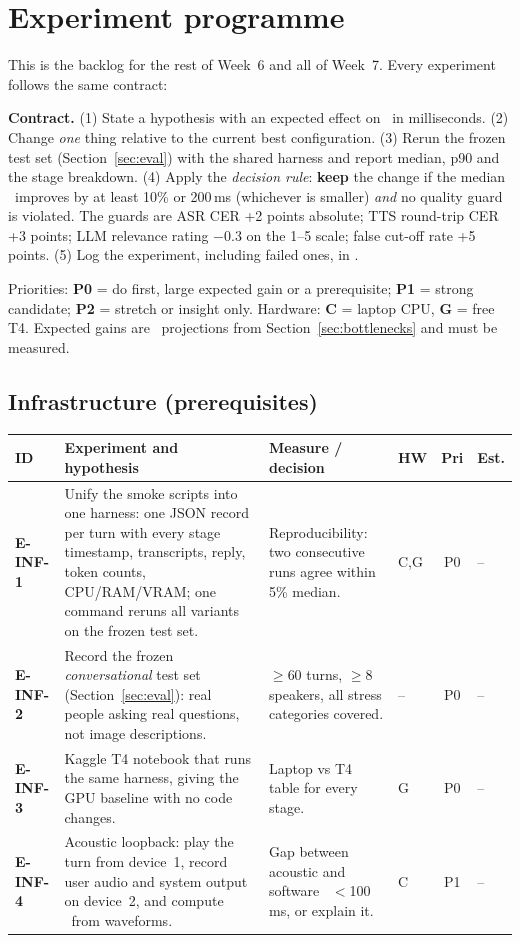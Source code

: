 \section{Experiment programme}
\label{sec:experiments}

This is the backlog for the rest of Week~6 and all of Week~7. Every experiment follows the same
contract:
\begin{keybox}
\textbf{Contract.} (1) State a hypothesis with an expected effect on \ttfa\ in milliseconds. (2) Change
\emph{one} thing relative to the current best configuration. (3) Rerun the frozen test set
(Section~\ref{sec:eval}) with the shared harness and report median, p90 and the stage breakdown.
(4) Apply the \emph{decision rule}: \textbf{keep} the change if the median \ttfa\ improves by at least
10\% or 200\,ms (whichever is smaller) \emph{and} no quality guard is violated. The guards are ASR CER
+2 points absolute; TTS round-trip CER +3 points; LLM relevance rating $-0.3$ on the 1--5 scale;
false cut-off rate +5 points. (5) Log the experiment, including failed ones, in
.
\end{keybox}

Priorities: \textbf{P0} = do first, large expected gain or a prerequisite; \textbf{P1} = strong
candidate; \textbf{P2} = stretch or insight only. Hardware: \textbf{C} = laptop CPU, \textbf{G} = free T4.
Expected gains are \proj\ projections from Section~\ref{sec:bottlenecks} and must be measured.

\setlength{\tabcolsep}{3.5pt}
\newcommand{\exprow}[6]{\textbf{#1} & #2 & #3 & #4 & #5 & #6 \\}
\newcommand{\exphead}{\toprule \textbf{ID} & \textbf{Experiment and hypothesis} & \textbf{Measure / decision} & \textbf{HW} & \textbf{Pri} & \textbf{Est.} \\ \midrule}

\subsection{Infrastructure (prerequisites)}
\begingroup\footnotesize
\begin{longtable}{@{}L{1.45cm}L{5.7cm}L{4.2cm}L{1.0cm}cL{1.5cm}@{}}
\exphead
\exprow{E-INF-1}{Unify the smoke scripts into one harness: one JSON record per turn with every stage timestamp, transcripts, reply, token counts, CPU/RAM/VRAM; one command reruns all variants on the frozen test set.}{Reproducibility: two consecutive runs agree within 5\% median.}{C,G}{P0}{--}
\exprow{E-INF-2}{Record the frozen \emph{conversational} test set (Section~\ref{sec:eval}): real people asking real questions, not image descriptions.}{$\geq$60 turns, $\geq$8 speakers, all stress categories covered.}{--}{P0}{--}
\exprow{E-INF-3}{Kaggle T4 notebook that runs the same harness, giving the GPU baseline with no code changes.}{Laptop vs T4 table for every stage.}{G}{P0}{--}
\exprow{E-INF-4}{Acoustic loopback: play the turn from device~1, record user audio and system output on device~2, and compute \ttfa\ from waveforms.}{Gap between acoustic and software \ttfa\ $<$100\,ms, or explain it.}{C}{P1}{--}
\bottomrule
\end{longtable}
\endgroup

